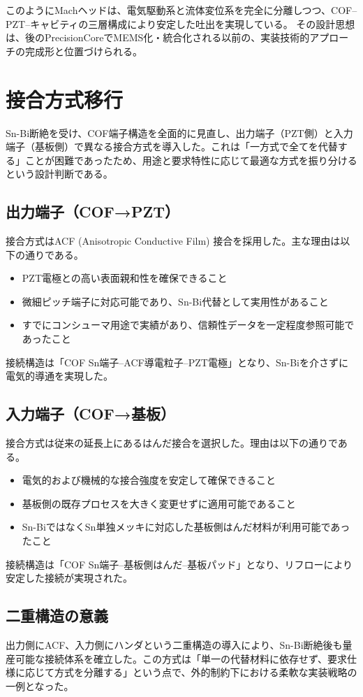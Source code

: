 \documentclass[conference]{IEEEtran}
\begin{document}
このようにMachヘッドは、電気駆動系と流体変位系を完全に分離しつつ、COF–PZT–キャビティの三層構成により安定した吐出を実現している。  
その設計思想は、後のPrecisionCoreでMEMS化・統合化される以前の、実装技術的アプローチの完成形と位置づけられる。

\section{接合方式移行}
Sn-Bi断絶を受け、COF端子構造を全面的に見直し、出力端子（PZT側）と入力端子（基板側）で異なる接合方式を導入した。これは「一方式で全てを代替する」ことが困難であったため、用途と要求特性に応じて最適な方式を振り分けるという設計判断である。

\subsection{出力端子（COF→PZT）}
接合方式はACF (Anisotropic Conductive Film) 接合を採用した。主な理由は以下の通りである。  
\begin{itemize}
  \item PZT電極との高い表面親和性を確保できること  
  \item 微細ピッチ端子に対応可能であり、Sn-Bi代替として実用性があること  
  \item すでにコンシューマ用途で実績があり、信頼性データを一定程度参照可能であったこと  
\end{itemize}
接続構造は「COF Sn端子–ACF導電粒子–PZT電極」となり、Sn-Biを介さずに電気的導通を実現した。

\subsection{入力端子（COF→基板）}
接合方式は従来の延長上にあるはんだ接合を選択した。理由は以下の通りである。  
\begin{itemize}
  \item 電気的および機械的な接合強度を安定して確保できること  
  \item 基板側の既存プロセスを大きく変更せずに適用可能であること  
  \item Sn-BiではなくSn単独メッキに対応した基板側はんだ材料が利用可能であったこと  
\end{itemize}
接続構造は「COF Sn端子–基板側はんだ–基板パッド」となり、リフローにより安定した接続が実現された。

\subsection{二重構造の意義}
出力側にACF、入力側にハンダという二重構造の導入により、Sn-Bi断絶後も量産可能な接続体系を確立した。この方式は「単一の代替材料に依存せず、要求仕様に応じて方式を分離する」という点で、外的制約下における柔軟な実装戦略の一例となった。
\end{document}
